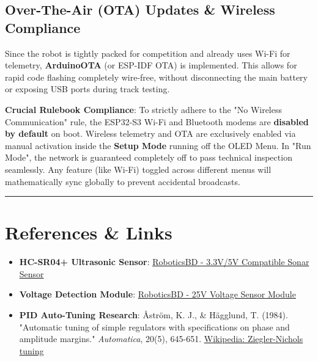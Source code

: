 \documentclass[12pt,a4paper]{article}
\begin{document}
\subsection*{Over-The-Air (OTA) Updates \& Wireless Compliance}
Since the robot is tightly packed for competition and already uses Wi-Fi for telemetry, \textbf{ArduinoOTA} (or ESP-IDF OTA) is implemented. This allows for rapid code flashing completely wire-free, without disconnecting the main battery or exposing USB ports during track testing.

\textbf{Crucial Rulebook Compliance}: To strictly adhere to the "No Wireless Communication" rule, the ESP32-S3 Wi-Fi and Bluetooth modems are \textbf{disabled by default} on boot. Wireless telemetry and OTA are exclusively enabled via manual activation inside the \textbf{Setup Mode} running off the OLED Menu. In "Run Mode", the network is guaranteed completely off to pass technical inspection seamlessly. Any feature (like Wi-Fi) toggled across different menus will mathematically sync globally to prevent accidental broadcasts.

\vspace{1em}
\hrule
\vspace{1em}

\section{References \& Links}
\begin{itemize}
    \item \textbf{HC-SR04+ Ultrasonic Sensor}: \href{https://store.roboticsbd.com/sensors/2446-hc-sr04-plus-ultrasonic-sonar-sensor-2021-33v-5v-robotics-bangladesh.html}{RoboticsBD - 3.3V/5V Compatible Sonar Sensor}
    \item \textbf{Voltage Detection Module}: \href{https://store.roboticsbd.com/sensors/2675-voltage-detection-sensor-module-25v-robotics-bangladesh.html}{RoboticsBD - 25V Voltage Sensor Module}
    \item \textbf{PID Auto-Tuning Research}: \r{A}str\"{o}m, K. J., \& H\"{a}gglund, T. (1984). "Automatic tuning of simple regulators with specifications on phase and amplitude margins." \textit{Automatica}, 20(5), 645-651. \href{https://en.wikipedia.org/wiki/Ziegler\%E2\%80\%93Nichols_method}{Wikipedia: Ziegler-Nichols tuning}
\end{itemize}
\end{document}
